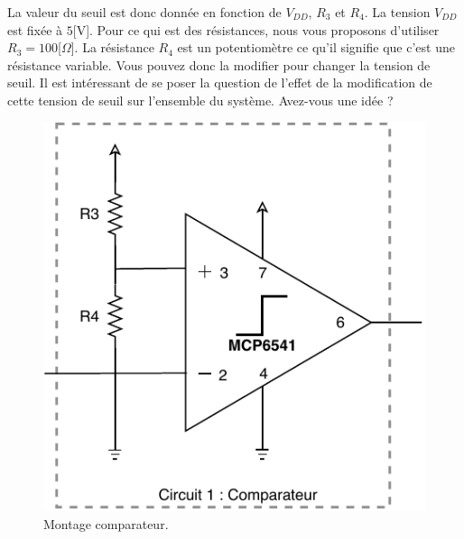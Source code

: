\vspace{0.3cm}

La valeur du seuil est donc donnée en fonction de $V_{DD}$, $R_3$ et $R_4$. La tension $V_{DD}$ est fixée à $5$[V]. Pour ce qui est des résistances, nous vous proposons d'utiliser $R_3=100$[$\Omega$]. La résistance $R_4$ est un potentiomètre ce qu'il signifie que c'est une résistance variable. Vous pouvez donc la modifier pour changer la tension de seuil. Il est intéressant de se poser la question de l'effet de la modification de cette tension de seuil sur l'ensemble du système. Avez-vous une idée ?

\vspace{0.5cm}
\begin{figure}[h!]
    \centering
    \includegraphics[width=0.5\linewidth]{HO2_comp.pdf}
    \caption{Montage comparateur.}
    \label{fig:comparecircuit}
\end{figure}